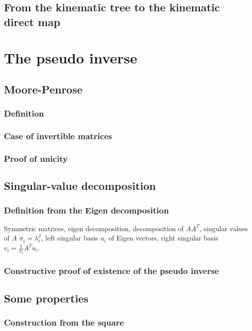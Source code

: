 \documentclass{book}
\begin{document}
\section{From the kinematic tree to the kinematic direct map}



\chapter{The pseudo inverse}

\section{Moore-Penrose}
\subsection{Definition}
\subsection{Case of invertible matrices}
\subsection{Proof of unicity}

\section{Singular-value decomposition}
\subsection{Definition from the Eigen decomposition}
Symmetric matrices, eigen decomposition, decomposition of $AA^T$, singular values of $A$ $\sigma_i = \lambda_i^2$, left singular basis $u_i$ of Eigen vectors, right singular basis $v_i = \frac{1}{\sigma_i} A^T u_i$. 
\subsection{Constructive proof of existence of the pseudo inverse}


\section{Some properties}
\subsection{Construction from the square} %
\end{document}
